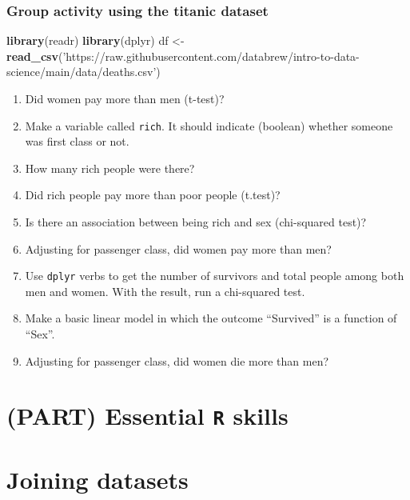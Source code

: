 \documentclass[
]{book}
\newenvironment{Shaded}{\begin{snugshade}}{\end{snugshade}}
\newcommand{\KeywordTok}[1]{\textcolor[rgb]{0.13,0.29,0.53}{\textbf{#1}}}
\newcommand{\NormalTok}[1]{#1}
\newcommand{\StringTok}[1]{\textcolor[rgb]{0.31,0.60,0.02}{#1}}
\begin{document}
\hypertarget{group-activity-using-the-titanic-dataset}{%
\subsection{Group activity using the titanic dataset}\label{group-activity-using-the-titanic-dataset}}

\begin{Shaded}
\begin{Highlighting}[]
\KeywordTok{library}\NormalTok{(readr)}
\KeywordTok{library}\NormalTok{(dplyr)}
\NormalTok{df <-}\StringTok{ }\KeywordTok{read_csv}\NormalTok{(}\StringTok{'https://raw.githubusercontent.com/databrew/intro-to-data-science/main/data/deaths.csv'}\NormalTok{)}
\end{Highlighting}
\end{Shaded}

\begin{enumerate}
\def\labelenumi{\arabic{enumi}.}
\item
  Did women pay more than men (t-test)?
\item
  Make a variable called \texttt{rich}. It should indicate (boolean) whether someone was first class or not.
\item
  How many rich people were there?
\item
  Did rich people pay more than poor people (t.test)?
\item
  Is there an association between being rich and sex (chi-squared test)?
\item
  Adjusting for passenger class, did women pay more than men?
\item
  Use \texttt{dplyr} verbs to get the number of survivors and total people among both men and women. With the result, run a chi-squared test.
\item
  Make a basic linear model in which the outcome ``Survived'' is a function of ``Sex''.
\item
  Adjusting for passenger class, did women die more than men?
\end{enumerate}

\hypertarget{part-essential-r-skills}{%
\chapter*{\texorpdfstring{(PART) Essential \texttt{R} skills}{(PART) Essential R skills}}\label{part-essential-r-skills}}

\hypertarget{joining_datasets}{%
\chapter{Joining datasets}\label{joining_datasets}}
\end{document}
